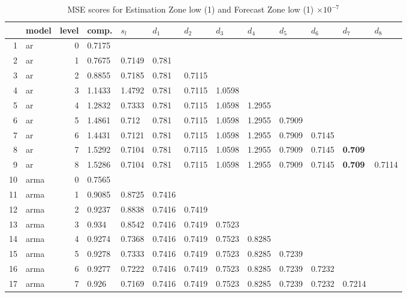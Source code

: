 \documentclass[10pt,a4paper]{article}
\begin{document}
\begin{table}[ht]
\centering
\caption{MSE scores for Estimation Zone low (1) and Forecast Zone low (1) $ \times 10^{-7}$} 
\begin{tabular}{rlrllllllllll}
  \hline
 & model & level & comp. & $s_l$ & $d_1$ & $d_2$ & $d_3$ & $d_4$ & $d_5$ & $d_6$ & $d_7$ & $d_8$ \\ 
  \hline
1 & ar &     0 & 0.7175 &  &  &  &  &  &  &  &  &  \\ 
  2 & ar &     1 & 0.7675 & 0.7149 & 0.781 &  &  &  &  &  &  &  \\ 
  3 & ar &     2 & 0.8855 & 0.7185 & 0.781 & 0.7115 &  &  &  &  &  &  \\ 
  4 & ar &     3 & 1.1433 & 1.4792 & 0.781 & 0.7115 & 1.0598 &  &  &  &  &  \\ 
  5 & ar &     4 & 1.2832 & 0.7333 & 0.781 & 0.7115 & 1.0598 & 1.2955 &  &  &  &  \\ 
  6 & ar &     5 & 1.4861 & 0.712 & 0.781 & 0.7115 & 1.0598 & 1.2955 & 0.7909 &  &  &  \\ 
  7 & ar &     6 & 1.4431 & 0.7121 & 0.781 & 0.7115 & 1.0598 & 1.2955 & 0.7909 & 0.7145 &  &  \\ 
  8 & ar &     7 & 1.5292 & 0.7104 & 0.781 & 0.7115 & 1.0598 & 1.2955 & 0.7909 & 0.7145 & \textbf{0.709} &  \\ 
  9 & ar &     8 & 1.5286 & 0.7104 & 0.781 & 0.7115 & 1.0598 & 1.2955 & 0.7909 & 0.7145 & \textbf{0.709} & 0.7114 \\ 
   \hline
10 & arma &     0 & 0.7565 &  &  &  &  &  &  &  &  &  \\ 
  11 & arma &     1 & 0.9085 & 0.8725 & 0.7416 &  &  &  &  &  &  &  \\ 
  12 & arma &     2 & 0.9237 & 0.8838 & 0.7416 & 0.7419 &  &  &  &  &  &  \\ 
  13 & arma &     3 & 0.934 & 0.8542 & 0.7416 & 0.7419 & 0.7523 &  &  &  &  &  \\ 
  14 & arma &     4 & 0.9274 & 0.7368 & 0.7416 & 0.7419 & 0.7523 & 0.8285 &  &  &  &  \\ 
  15 & arma &     5 & 0.9278 & 0.7333 & 0.7416 & 0.7419 & 0.7523 & 0.8285 & 0.7239 &  &  &  \\ 
  16 & arma &     6 & 0.9277 & 0.7222 & 0.7416 & 0.7419 & 0.7523 & 0.8285 & 0.7239 & 0.7232 &  &  \\ 
  17 & arma &     7 & 0.926 & 0.7169 & 0.7416 & 0.7419 & 0.7523 & 0.8285 & 0.7239 & 0.7232 & 0.7214 &  \\ 

\end{tabular}
\end{table}
\end{document}
